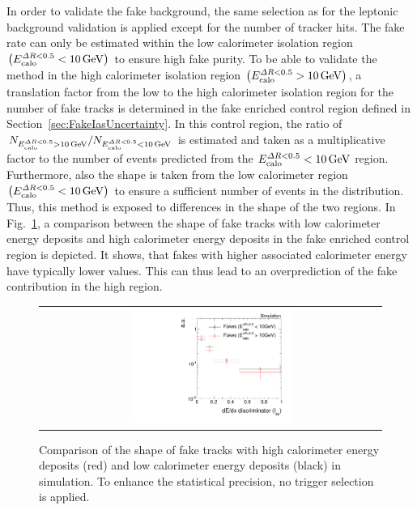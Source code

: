 In order to validate the fake background, the same selection as for the leptonic background validation is applied except for the number of tracker hits.
The fake rate can only be estimated within the low calorimeter isolation region $\left(E^{\Delta R<0.5}_{\text{calo}}<10\,\text{Ge}\kern-0.06667em\text{V}\right)$ to ensure high fake purity.
To be able to validate the method in the high calorimeter isolation region $\left(E^{\Delta R<0.5}_{\text{calo}}>10\,\text{Ge}\kern-0.06667em\text{V}\right)$, a translation factor from the low to the high calorimeter isolation region for the number of fake tracks is determined in the fake enriched control region \fakeCR defined in Section~\ref{sec:FakeIasUncertainty}.
In this control region, the ratio of $N_{E^{\Delta R<0.5}_{\text{calo}}>10\,\text{Ge}\kern-0.06667em\text{V}}/N_{E^{\Delta R<0.5}_{\text{calo}}<10\,\text{Ge}\kern-0.06667em\text{V}}$ is estimated and taken as a multiplicative factor to the number of events predicted from the $E^{\Delta R<0.5}_{\text{calo}}<10\,\text{Ge}\kern-0.06667em\text{V}$ region.
Furthermore, also the \ias shape is taken from the low calorimeter region $\left(E^{\Delta R<0.5}_{\text{calo}}<10\,\text{Ge}\kern-0.06667em\text{V}\right)$ to ensure a sufficient number of events in the \ias distribution. 
Thus, this method is exposed to differences in the \ias shape of the two \ecalo regions.
In Fig.~\ref{fig:IasValidate}, a comparison between the \ias shape of fake tracks with low calorimeter energy deposits and high calorimeter energy deposits in the fake enriched control region is depicted.
It shows, that fakes with higher associated calorimeter energy have typically lower \ias values. 
This can thus lead to an overprediction of the fake contribution in the high \ecalo region.
\begin{figure}[!b]
  \centering 
  \begin{tabular}{c}
    \includegraphics[width=0.49\textwidth]{figures/analysis_2/Background/IasForFakes_chiTrackspreselectionNoTrigger.pdf}
  \end{tabular}
  \caption{Comparison of the \ias shape of fake tracks with high calorimeter energy deposits (red) and low calorimeter energy deposits (black) in simulation.
           To enhance the statistical precision, no trigger selection is applied.}
  \label{fig:IasValidate}
\end{figure}
